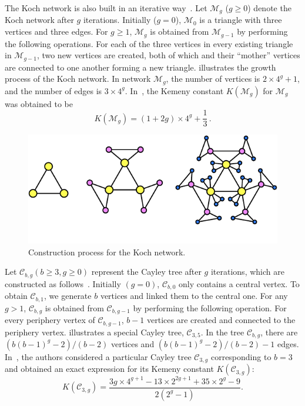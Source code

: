 \documentclass[10pt,journal,compsoc,twocolumn,twoside]{IEEEtran}
\begin{document}
The Koch network is also built in an iterative way~\cite{XiLiZh15}. Let \(\mathcal{M}_{g}\) (\(g \geq 0\)) denote the Koch network after \(g\) iterations. Initially (\(g=0\)), \(\mathcal{M}_{0}\) is a triangle with three
vertices and three edges. For \(g\geq 1\), \(\mathcal{M}_{g}\) is obtained from \(\mathcal{M}_{g-1}\) by
performing the following operations. For each of the three vertices in
every existing triangle in \(\mathcal{M}_{g-1}\), two new vertices are created, both of which and their
``mother'' vertices are connected to one another forming a new triangle.  illustrates the growth process of the Koch network.  In network \(\mathcal{M}_{g}\), the number of vertices is \(2\times 4^{g}+1\), and the number of
edges is \(3\times 4^{g}\).  In~\cite{XiLiZh15}, the Kemeny constant \(K(\mathcal{M}_g)\) for \(\mathcal{M}_g\) was obtained to be
\begin{equation}\label{Kg02}
    K(\mathcal{M}_g)=(1+2g)\times 4^g+\frac{1}{3}\,. %
\end{equation}

\begin{figure}[!t]
    \centering
    \includegraphics[width=0.85\linewidth]{Koch-eps-converted-to.pdf}
    \caption{Construction process for the Koch network.}
    \label{network}
\end{figure}

Let \(\mathcal{C}_{b,g}(b\ge3,g\ge0)\) represent the Cayley tree after
\(g\) iterations, which are constructed  as follows~\cite{CaCh97,ChCa99}. Initially \((g = 0)\), \(\mathcal{C}_{b,0}\) only contains a central vertex. To obtain \(\mathcal{C}_{b,1}\), we generate  \(b\) vertices and linked them to
the central one. For any \(g>1\), \(\mathcal{C}_{b,g}\) is obtained from \(\mathcal{C}_{b,g-1}\) by performing the following operation. For every periphery vertex of \(\mathcal{C}_{b,g-1}\), \(b-1\) vertices are created and connected to
the periphery vertex.  illustrates a special Cayley tree,
\(\mathcal{C}_{3,5}\). In the tree \(\mathcal{C}_{b,g}\), there are \((b(b-1)^g-2)/(b-2)\) vertices and \((b(b-1)^g-2)/(b-2)-1\) edges. In~\cite{JuWuZh13}, the authors  considered a particular Cayley tree \(\mathcal{C}_{3,g}\) corresponding to \(b=3\) and obtained an exact expression for its  Kemeny constant \(K(\mathcal{C}_{3,g})\):
\begin{equation}\label{Kg03}
    K(\mathcal{C}_{3,g})=\frac{3g\times 4^{g+1}-13\times 2^{2g+1} + 35\times 2^g - 9}{2(2^g-1)}.
\end{equation}
\end{document}
